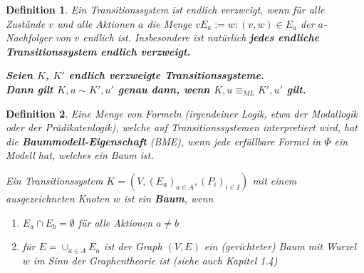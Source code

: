 \documentclass[12pt,a4paper]{article}
\newtheorem{defi}{Definition}[section]
\begin{document}
\begin{defi}
Ein Transitionssystem ist endlich verzweigt, wenn für
alle Zustände $v$ und alle Aktionen $a$ die Menge $vE_a := {w : (v, w) \in E_a}$
der $a$-Nachfolger von $v$ endlich ist. Insbesondere ist natürlich \textbf{jedes
endliche Transitionssystem endlich verzweigt.}

\textbf{Seien $K$, $K'$ endlich verzweigte Transitionssysteme. \\Dann gilt
$K, u \sim K', u'$ genau dann, wenn $K, u \equiv_{ML} K', u'$ gilt.}

\end{defi}

\begin{defi}
Eine Menge von Formeln (irgendeiner Logik, etwa der Modallogik oder
der Prädikatenlogik), welche auf Transitionssystemen interpretiert wird,
hat die \textbf{Baummodell-Eigenschaft} (BME), wenn jede erfüllbare Formel in $\Phi$
ein Modell hat, welches ein Baum ist.

Ein Transitionssystem $K = (V,(E_a)_{a\in A},(P_i)_{i\in I})$ 
mit einem ausgezeichneten Knoten $w$ ist ein \textbf{Baum}, wenn
\begin{enumerate}
 \item $E_a \cap E_b = \emptyset $ für alle Aktionen $a \neq b$
 \item für $E = \cup_{a\in A} E_a$ ist der Graph $(V, E)$ ein (gerichteter) Baum mit
Wurzel $w$ im Sinn der Graphentheorie ist (siehe auch Kapitel 1.4)
\end{enumerate}

\end{defi}
\newpage
\end{document}
